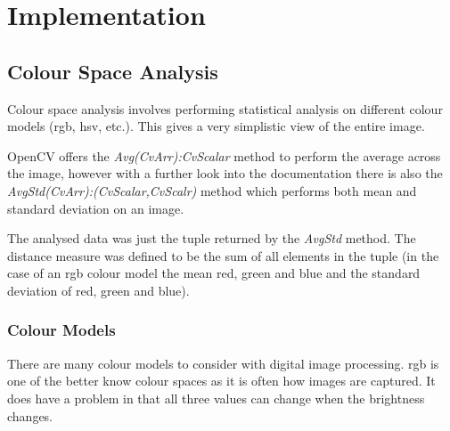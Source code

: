 \chapter{Implementation}



\section{Colour Space Analysis}
Colour space analysis involves performing statistical analysis on different colour models 
(\gls{rgb}, \gls{hsv}, etc.). This gives a very simplistic view of the entire image.

OpenCV offers the \textit{Avg(CvArr):CvScalar} method to perform the average across the image, 
however with a further look into the documentation there is also the 
\textit{AvgStd(CvArr):(CvScalar,CvScalr)} method which performs both mean and standard deviation
on an image.

The analysed data was just the tuple returned by the \textit{AvgStd} method. The distance measure
was defined to be the sum of all elements in the tuple (in the case of an \gls{rgb} colour model
the mean red, green and blue and the standard deviation of red, green and blue).

\subsection{Colour Models}
There are many colour models to consider with digital image processing. \Gls{rgb} is one of the
better know colour spaces as it is often how images are captured. It does have a problem in that
all three values can change when the brightness changes.

